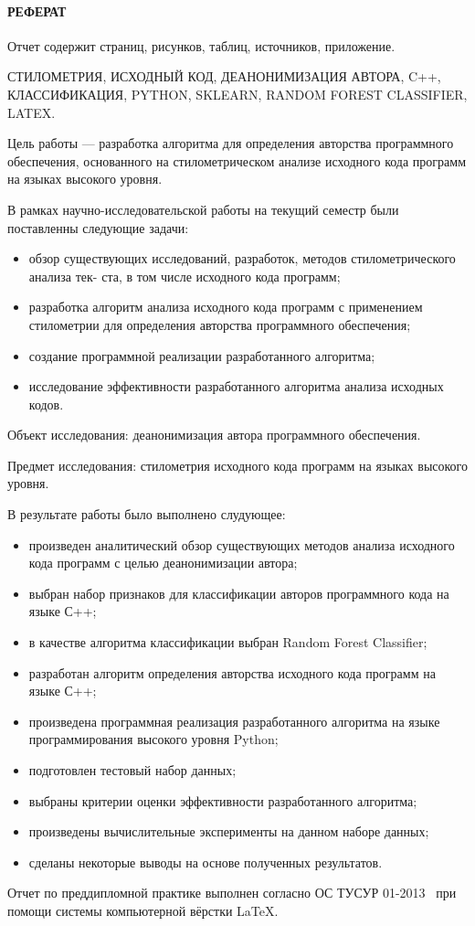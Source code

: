 \newpage
{}
\paragraph{\hfill РЕФЕРАТ \hfill}
Отчет содержит  страниц,  рисунков,  таблиц,  источников,  приложение.

СТИЛОМЕТРИЯ, ИСХОДНЫЙ КОД, ДЕАНОНИМИЗАЦИЯ АВТОРА, C++, КЛАССИФИКАЦИЯ, PYTHON, SKLEARN, RANDOM FOREST CLASSIFIER, LATEX.

Цель работы --- разработка алгоритма для определения авторства программного обеспечения, основанного на стилометрическом анализе исходного кода программ на языках высокого уровня.

В рамках научно-исследовательской работы на текущий семестр были поставленны следующие задачи: 
\begin{itemize}
  \item обзор существующих исследований, разработок, методов стилометрического анализа тек-
ста, в том числе исходного кода программ;
  \item разработка алгоритм анализа исходного кода программ с применением стилометрии для
определения авторства программного обеспечения;
  \item создание программной реализации разработанного алгоритма;
  \item исследование эффективности разработанного алгоритма анализа исходных кодов.
\end{itemize}

Объект исследования: деанонимизация автора программного обеспечения. 

Предмет исследования: стилометрия исходного кода программ на языках высокого уровня.

В результате работы было выполнено слудующее:

\begin{itemize}
  \item произведен аналитический обзор существующих методов анализа исходного кода программ с целью деанонимизации автора;
  \item выбран набор признаков для классификации авторов программного кода на языке С++; 
  \item в качестве алгоритма классификации выбран Random Forest Classifier;
  \item разработан алгоритм определения авторства исходного кода программ на языке С++;
  \item произведена программная реализация разработанного алгоритма на языке программирования высокого уровня Python;
  \item подготовлен тестовый набор данных;
  \item выбраны критерии оценки эффективности разработанного алгоритма;
  \item произведены вычислительные эксперименты на данном наборе данных;
  \item сделаны некоторые выводы на основе полученных результатов.
\end{itemize}

Отчет по преддипломной практике выполнен согласно ОС ТУСУР 01-2013~\cite{ostusur} при помощи системы компьютерной вёрстки \LaTeX. 
